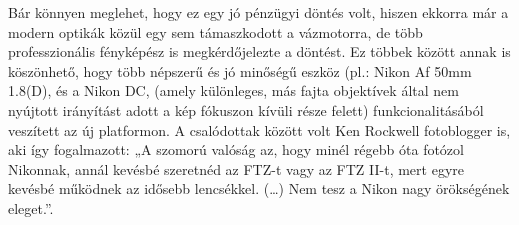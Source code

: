 Bár könnyen meglehet, hogy ez egy jó pénzügyi döntés volt, hiszen ekkorra már a modern optikák közül egy sem támaszkodott a vázmotorra, de több professzionális fényképész is megkérdőjelezte a döntést. Ez többek között annak is köszönhető, hogy több népszerű és jó minőségű eszköz (pl.: Nikon Af 50mm 1.8(D), és a Nikon DC, (amely különleges, más fajta objektívek által nem nyújtott irányítást adott a kép fókuszon kívüli része felett) funkcionalitásából veszített az új platformon. A csalódottak között volt Ken Rockwell fotoblogger is, aki így fogalmazott: „A szomorú valóság az, hogy minél régebb óta fotózol Nikonnak, annál kevésbé szeretnéd az FTZ-t vagy az FTZ II-t, mert egyre kevésbé működnek az idősebb lencsékkel. (…) Nem tesz a Nikon nagy örökségének eleget.”\cite{Nikon_FTZ_Review}.